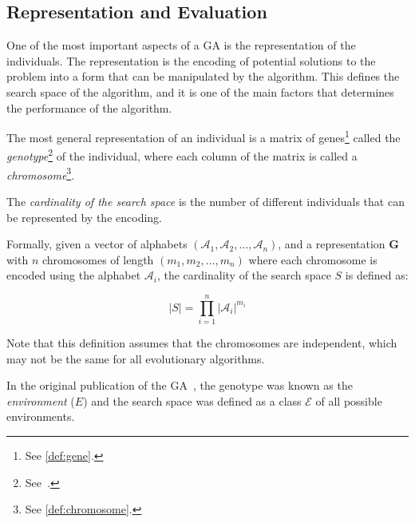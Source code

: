 \subsection{Representation and Evaluation}
\label{ssec:genetic_algorithms:representation}
  One of the most important aspects of a GA is the representation of the individuals.
  The representation is the encoding of potential solutions to the problem into a form that can be
  manipulated by the algorithm.
  This defines the search space of the algorithm, and it is one of the main factors that
  determines the performance of the algorithm.

  The most general representation of an individual is a matrix of genes\footnote{
    See \vref{def:gene}.
  } called the \emph{genotype}\footnote{See~\autocite{wilhelmstotterJeneticsJavaGenetica}.} of the 
  individual, where each column of the matrix is called a \emph{chromosome}\footnote{
    See \vref{def:chromosome}.
  }.
  
  \begin{definition}
  \label{def:cardinality_of_the_search_space}
    The \emph{cardinality of the search space} is the number of different individuals that 
    can be represented by the encoding.

    Formally, given a vector of alphabets \((\mathcal{A}_1, \mathcal{A}_2, \dots, \mathcal{A}_n)\), 
    and a representation \(\mathbf{G}\) with \(n\) chromosomes of length \((m_1, m_2, \dots, 
    m_n)\) where each chromosome is encoded using the alphabet \(\mathcal{A}_i\), the cardinality 
    of the search space \(S\) is defined as:
    
    \begin{equation}
      \label{eq:cardinality_of_the_search_space}
      |S| = \prod_{i=1}^n |\mathcal{A}_i|^{m_i}
    \end{equation}

    Note that this definition assumes that the chromosomes are independent, which may not be the 
    same for all evolutionary algorithms.
  \end{definition}

  \begin{remark}
    In the original publication of the GA~\autocite{hollandAdaptationNaturalArtificial1992a}, the
    genotype was known as the \emph{environment} (\(E\)) and the search space was defined as a class
    \(\mathcal{E}\) of all possible environments.
  \end{remark}

